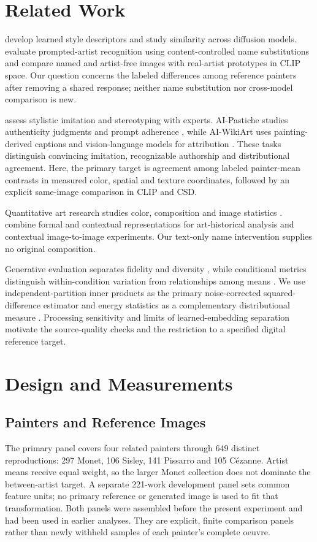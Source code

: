 \section{Related Work}
\citet{somepalli2024style} develop learned style descriptors and study similarity
across diffusion models. \citet{su2025prompted} evaluate prompted-artist
recognition using content-controlled name substitutions and compare named and
artist-free images with real-artist prototypes in CLIP space. Our question
concerns the labeled differences among reference painters after removing a
shared response; neither name substitution nor cross-model comparison is new.

\citet{deliege2025} assess stylistic imitation and stereotyping with experts.
AI-Pastiche studies authenticity judgments and prompt adherence
\citep{asperti2025pastiche}, while AI-WikiArt uses painting-derived captions and
vision-language models for attribution \citep{fu2025aiwikiart}. These tasks
distinguish convincing imitation, recognizable authorship and distributional
agreement. Here, the primary target is agreement among labeled painter-mean contrasts
in measured color, spatial and texture coordinates, followed by an explicit
same-image comparison in CLIP and CSD.

Quantitative art research studies color, composition and image statistics
\citep{kim2014,sigaki2018,lee2020}. \citet{kim2026} combine formal and contextual
representations for art-historical analysis and contextual image-to-image
experiments. Our text-only name intervention supplies no original composition.

Generative evaluation separates fidelity and diversity \citep{naeem2020},
while conditional metrics distinguish within-condition variation from relationships
among means \citep{benny2021conditional}. We use independent-partition inner products
as the primary noise-corrected squared-difference estimator \citep{diedrichsen2017representational}
and energy statistics as a complementary distributional measure \citep{szekely2013}.
Processing sensitivity \citep{parmar2022} and limits of learned-embedding
separation \citep{asperti2026} motivate the source-quality checks and the
restriction to a specified digital reference target.

\section{Design and Measurements}\label{sec:design}
\subsection{Painters and Reference Images}
The primary panel covers four related painters through 649 distinct reproductions: 297 Monet,
106 Sisley, 141 Pissarro and 105 C\'ezanne. Artist means receive equal weight,
so the larger Monet collection does not dominate the between-artist target.
A separate 221-work development panel sets common feature units; no primary
reference or generated image is used to fit that transformation. Both panels
were assembled before the present experiment and had been used in earlier
analyses. They are explicit, finite comparison panels rather than newly withheld
samples of each painter's complete oeuvre.

